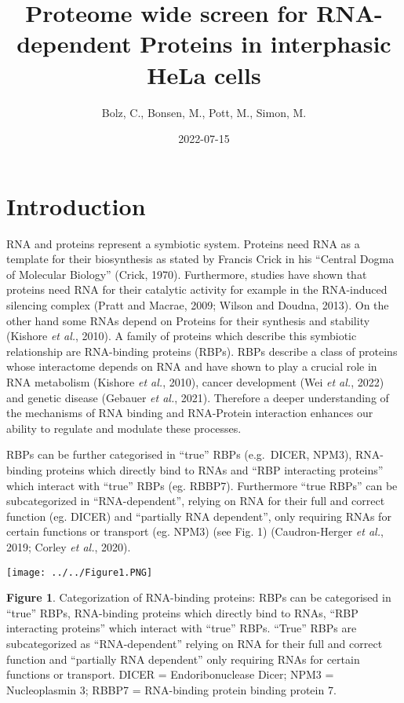 \documentclass[
]{article}
\title{Proteome wide screen for RNA-dependent Proteins in interphasic
HeLa cells}
\author{Bolz, C., Bonsen, M., Pott, M., Simon, M.}
\date{2022-07-15}
\begin{document}
\maketitle

\hypertarget{introduction}{%
\section{Introduction}\label{introduction}}

RNA and proteins represent a symbiotic system. Proteins need RNA as a
template for their biosynthesis as stated by Francis Crick in his
``Central Dogma of Molecular Biology'' (Crick, 1970). Furthermore,
studies have shown that proteins need RNA for their catalytic activity
for example in the RNA-induced silencing complex (Pratt and Macrae,
2009; Wilson and Doudna, 2013). On the other hand some RNAs depend on
Proteins for their synthesis and stability (Kishore \emph{et al.},
2010). A family of proteins which describe this symbiotic relationship
are RNA-binding proteins (RBPs). RBPs describe a class of proteins whose
interactome depends on RNA and have shown to play a crucial role in RNA
metabolism (Kishore \emph{et al.}, 2010), cancer development (Wei
\emph{et al.}, 2022) and genetic disease (Gebauer \emph{et al.}, 2021).
Therefore a deeper understanding of the mechanisms of RNA binding and
RNA-Protein interaction enhances our ability to regulate and modulate
these processes.

RBPs can be further categorised in ``true'' RBPs (e.g.~DICER, NPM3),
RNA-binding proteins which directly bind to RNAs and ``RBP interacting
proteins'' which interact with ``true'' RBPs (eg. RBBP7). Furthermore
``true RBPs'' can be subcategorized in ``RNA-dependent'', relying on RNA
for their full and correct function (eg. DICER) and ``partially RNA
dependent'', only requiring RNAs for certain functions or transport (eg.
NPM3) (see Fig. 1) (Caudron-Herger \emph{et al.}, 2019; Corley \emph{et
al.}, 2020).

\texttt{[image: ../../Figure1.PNG]}

\textbf{Figure 1}. Categorization of RNA-binding proteins: RBPs can be
categorised in ``true'' RBPs, RNA-binding proteins which directly bind
to RNAs, ``RBP interacting proteins'' which interact with ``true'' RBPs.
``True'' RBPs are subcategorized as ``RNA-dependent'' relying on RNA for
their full and correct function and ``partially RNA dependent'' only
requiring RNAs for certain functions or transport. DICER =
Endoribonuclease Dicer; NPM3 = Nucleoplasmin 3; RBBP7 = RNA-binding
protein binding protein 7.
\end{document}
